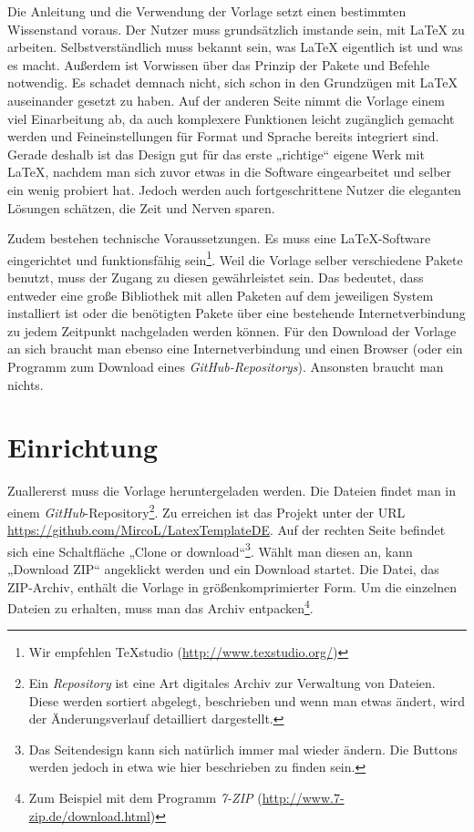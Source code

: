 			Die Anleitung und die Verwendung der Vorlage setzt einen bestimmten Wissenstand voraus. Der Nutzer muss grundsätzlich imstande sein, mit \LaTeX{} zu arbeiten. Selbstverständlich muss bekannt sein, was \LaTeX{} eigentlich ist und was es macht. Außerdem ist Vorwissen über das Prinzip der Pakete und Befehle notwendig. Es schadet demnach nicht, sich schon in den Grundzügen mit \LaTeX{} auseinander gesetzt zu haben. Auf der anderen Seite nimmt die Vorlage einem viel Einarbeitung ab, da auch komplexere Funktionen leicht zugänglich gemacht werden und Feineinstellungen für Format und Sprache bereits integriert sind. Gerade deshalb ist das Design gut für das erste „richtige“ eigene Werk mit \LaTeX{}, nachdem man sich zuvor etwas in die Software eingearbeitet und selber ein wenig probiert hat. Jedoch werden auch fortgeschrittene Nutzer die eleganten Lösungen schätzen, die Zeit und Nerven sparen. 
			
			Zudem bestehen technische Voraussetzungen. Es muss eine \LaTeX{}-Software eingerichtet und funktionsfähig sein\footnote{Wir empfehlen TeXstudio (\url{http://www.texstudio.org/})}. Weil die Vorlage selber verschiedene Pakete benutzt, muss der Zugang zu diesen gewährleistet sein. Das bedeutet, dass entweder eine große Bibliothek mit allen Paketen auf dem jeweiligen System installiert ist oder die benötigten Pakete über eine bestehende Internetverbindung zu jedem Zeitpunkt nachgeladen werden können. Für den Download der Vorlage an sich braucht man ebenso eine Internetverbindung und einen Browser (oder ein Programm zum Download eines \emph{GitHub-Repositorys}). Ansonsten braucht man nichts. 
		
		\section{Einrichtung}
		
			Zuallererst muss die Vorlage heruntergeladen werden. Die Dateien findet man in einem \emph{GitHub}-Repository\footnote{Ein \emph{Repository} ist eine Art digitales Archiv zur Verwaltung von Dateien. Diese werden sortiert abgelegt, beschrieben und wenn man etwas ändert, wird der Änderungsverlauf detailliert dargestellt.}. Zu erreichen ist das Projekt unter der URL \url{https://github.com/MircoL/LatexTemplateDE}. Auf der rechten Seite befindet sich eine Schaltfläche „Clone or download“\footnote{Das Seitendesign kann sich natürlich immer mal wieder ändern. Die Buttons werden jedoch in etwa wie hier beschrieben zu finden sein.}. Wählt man diesen an, kann „Download ZIP“ angeklickt werden und ein Download startet. Die Datei, das ZIP-Archiv, enthält die Vorlage in größenkomprimierter Form. Um die einzelnen Dateien zu erhalten, muss man das Archiv entpacken\footnote{Zum Beispiel mit dem Programm \emph{7-ZIP} (\url{http://www.7-zip.de/download.html})}. 
			
